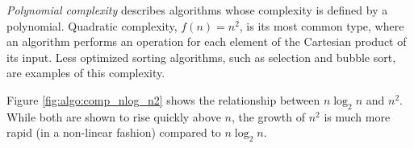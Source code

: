 \textit{Polynomial complexity} describes algorithms whose complexity is defined
by a polynomial.  Quadratic complexity, $f(n) = n^2$, is its most common type,
where an algorithm performs an operation for each element of the Cartesian
product of its input.  Less optimized sorting algorithms, such as selection and
bubble sort, are examples of this complexity.

Figure \ref{fig:algo:comp_nlog_n2} shows the relationship between $n \log_{2}n$
and $n^2$.  While both are shown to rise quickly above $n$, the growth of $n^2$
is much more rapid (in a non-linear fashion) compared to $n \log_{2}n$.
